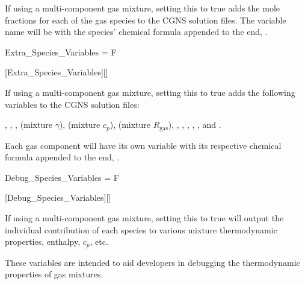 \begin{nmldescbody}
If using a multi-component gas mixture, setting this to true adds the
mole fractions for each of the gas species to the CGNS solution files.
%
The variable name will be  with the species' chemical
formula appended to the end, \forexample {}.
\end{nmldescbody}


\begin{nmldescitem}
Extra_Species_Variables = F
\end{nmldescitem}
[Extra\_Species\_Variables][]

\begin{nmldescbody}
If using a multi-component gas mixture, setting this to true adds the
following variables to the CGNS solution files:
\\\raggedright
  ,
  ,
  ,
   (\thatis mixture $\gamma$),
   (\thatis mixture $c_p$),
   (\thatis mixture $R_{\mathrm{gas}}$),
  ,
  ,
  ,
  ,
  , and
  .

Each gas component will have its own  variable
with its respective chemical formula appended to the end,
\forexample {}.
\end{nmldescbody}


\begin{nmldescitem}
Debug_Species_Variables = F
\end{nmldescitem}
[Debug\_Species\_Variables][]

\begin{nmldescbody}
If using a multi-component gas mixture, setting this to true will output the
individual contribution of each species to various mixture thermodynamic
properties, \forexample enthalpy, $c_p$, etc.

\NOTE
These variables are intended to aid developers in debugging the
thermodynamic properties of gas mixtures.
\end{nmldescbody}

